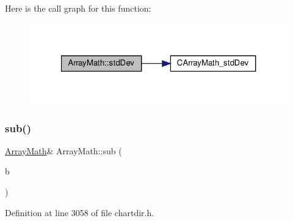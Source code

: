 Here is the call graph for this function\+:
\nopagebreak
\begin{figure}[H]
\begin{center}
\leavevmode
\includegraphics[width=321pt]{class_array_math_a71fbcf5d93c40e840b4aa7fbea38e98e_cgraph}
\end{center}
\end{figure}
\mbox{\label{class_array_math_a67bc79157b230866a8ed1eb5e6179de0}} 
\subsubsection{\texorpdfstring{sub()}{sub()}\hspace{0.1cm}{\footnotesize\ttfamily [1/2]}}
{\footnotesize\ttfamily \hyperlink{class_array_math}{Array\+Math}\& Array\+Math\+::sub (\begin{DoxyParamCaption}\item[{\hyperlink{class_double_array}{Double\+Array}}]{b }\end{DoxyParamCaption})\hspace{0.3cm}{\ttfamily [inline]}}



Definition at line 3058 of file chartdir.\+h.


